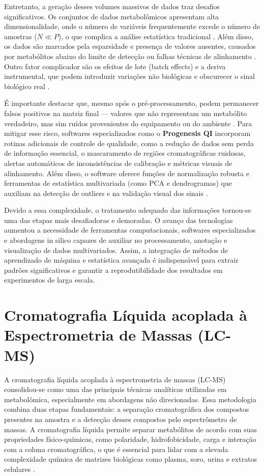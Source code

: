 Entretanto, a geração desses volumes massivos de dados traz desafios significativos. Os conjuntos de dados metabolômicos apresentam alta dimensionalidade, onde o número de variáveis frequentemente excede o número de amostras ($N \ll P$), o que complica a análise estatística tradicional \cite{LILAND2011827,picone2026integrating}. Além disso, os dados são marcados pela esparsidade e presença de valores ausentes, causados por metabólitos abaixo do limite de detecção ou falhas técnicas de alinhamento \cite{li2016performance}. Outro fator complicador são os efeitos de lote (batch effects) e a deriva instrumental, que podem introduzir variações não biológicas e obscurecer o sinal biológico real \cite{li2016performance}.

É importante destacar que, mesmo após o pré-processamento, podem permanecer falsos positivos na matriz final — valores que não representam um metabólito verdadeiro, mas sim ruídos provenientes do equipamento ou do ambiente \cite{schiffman2018data}. Para mitigar esse risco, softwares especializados como o \textbf{Progenesis QI} incorporam rotinas adicionais de controle de qualidade, como a redução de dados sem perda de informação essencial, o mascaramento de regiões cromatográficas ruidosas, alertas automáticos de inconsistências de calibração e métricas visuais de alinhamento. Além disso, o software oferece funções de normalização robusta e ferramentas de estatística multivariada (como PCA e dendrogramas) que auxiliam na detecção de outliers e na validação visual dos sinais \cite{watersprogenesisguide}.

Devido a essa complexidade, o tratamento adequado das informações tornou-se uma das etapas mais desafiadoras e demoradas. O avanço das tecnologias aumentou a necessidade de ferramentas computacionais, softwares especializados e abordagens in silico capazes de auxiliar no processamento, anotação e visualização de dados multivariados. Assim, a integração de métodos de aprendizado de máquina e estatística avançada é indispensável para extrair padrões significativos e garantir a reprodutibilidade dos resultados em experimentos de larga escala.


\section{\textbf{Cromatografia Líquida acoplada à Espectrometria de Massas (LC-MS)}}

A cromatografia líquida acoplada à espectrometria de massas (LC-MS) consolidou-se como uma das principais técnicas analíticas utilizadas em metabolômica, especialmente em abordagens não direcionadas. Essa metodologia combina duas etapas fundamentais: a separação cromatográfica dos compostos presentes na amostra e a detecção desses compostos pelo espectrômetro de massas. A cromatografia líquida permite separar metabólitos de acordo com suas propriedades físico-químicas, como polaridade, hidrofobicidade, carga e interação com a coluna cromatográfica, o que é essencial para lidar com a elevada complexidade química de matrizes biológicas como plasma, soro, urina e extratos celulares \cite{chen2022guide}.


